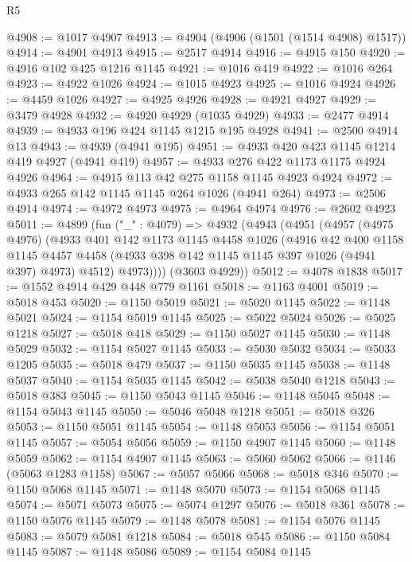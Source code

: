 \begin{lexlean}{R5}
\begin{coremodule}
@4908 := @1017 @4907
@4913 := @4904 (@4906 (@1501 (@1514 @4908) @1517))
@4914 := @4901 @4913
@4915 := @2517 @4914
@4916 := @4915 @150
@4920 := @4916 @102 @425 @1216 @1145
@4921 := @1016 @419
@4922 := @1016 @264
@4923 := @4922 @1026
@4924 := @1015 @4923
@4925 := @1016 @4924
@4926 := @4459 @1026
@4927 := @4925 @4926
@4928 := @4921 @4927
@4929 := @3479 @4928
@4932 := @4920 @4929 (@1035 @4929)
@4933 := @2477 @4914
@4939 := @4933 @196 @424 @1145 @1215 @195 @4928
@4941 := @2500 @4914 @13
@4943 := @4939 (@4941 @195)
@4951 := @4933 @420 @423 @1145 @1214 @419 @4927 (@4941 @419)
@4957 := @4933 @276 @422 @1173 @1175 @4924 @4926
@4964 := @4915 @113 @42 @275 @1158 @1145 @4923 @4924
@4972 := @4933 @265 @142 @1145 @1145 @264 @1026 (@4941 @264)
@4973 := @2506 @4914
@4974 := @4972 @4973
@4975 := @4964 @4974
@4976 := @2602 @4923
@5011 := @4899
    (fun ("_" : @4079) =>
    @4932
      (@4943
        (@4951
          (@4957
            (@4975 @4976)
            (@4933
              @401
              @142
              @1173
              @1145
              @4458
              @1026
              (@4916
                @42
                @400
                @1158
                @1145
                @4457
                @4458
                (@4933 @398 @142 @1145 @1145 @397 @1026 (@4941 @397) @4973)
                @4512)
              @4973))))
      (@3603 @4929))
@5012 := @4078 @1838
@5017 := @1552 @4914 @429 @448 @779 @1161
@5018 := @1163 @4001
@5019 := @5018 @453
@5020 := @1150 @5019
@5021 := @5020 @1145
@5022 := @1148 @5021
@5024 := @1154 @5019 @1145
@5025 := @5022 @5024
@5026 := @5025 @1218
@5027 := @5018 @418
@5029 := @1150 @5027 @1145
@5030 := @1148 @5029
@5032 := @1154 @5027 @1145
@5033 := @5030 @5032
@5034 := @5033 @1205
@5035 := @5018 @479
@5037 := @1150 @5035 @1145
@5038 := @1148 @5037
@5040 := @1154 @5035 @1145
@5042 := @5038 @5040 @1218
@5043 := @5018 @383
@5045 := @1150 @5043 @1145
@5046 := @1148 @5045
@5048 := @1154 @5043 @1145
@5050 := @5046 @5048 @1218
@5051 := @5018 @326
@5053 := @1150 @5051 @1145
@5054 := @1148 @5053
@5056 := @1154 @5051 @1145
@5057 := @5054 @5056
@5059 := @1150 @4907 @1145
@5060 := @1148 @5059
@5062 := @1154 @4907 @1145
@5063 := @5060 @5062
@5066 := @1146 (@5063 @1283 @1158)
@5067 := @5057 @5066
@5068 := @5018 @346
@5070 := @1150 @5068 @1145
@5071 := @1148 @5070
@5073 := @1154 @5068 @1145
@5074 := @5071 @5073
@5075 := @5074 @1297
@5076 := @5018 @361
@5078 := @1150 @5076 @1145
@5079 := @1148 @5078
@5081 := @1154 @5076 @1145
@5083 := @5079 @5081 @1218
@5084 := @5018 @545
@5086 := @1150 @5084 @1145
@5087 := @1148 @5086
@5089 := @1154 @5084 @1145

\end{coremodule}
\end{lexlean}
